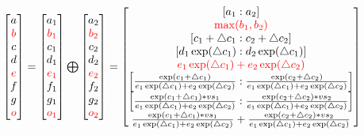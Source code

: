 $
\begin{bmatrix}
  a \\
  \textcolor{red}{b} \\
  c \\
  d \\
  \textcolor{red}{e} \\
  f \\
  g \\
  \textcolor{red}{o}
\end{bmatrix} = 
\begin{bmatrix}
  a_1 \\
  \textcolor{red}{b_1} \\
  c_1 \\
  d_1 \\
  \textcolor{red}{e_1} \\
  f_1 \\
  g_1 \\
  \textcolor{red}{o_1}
\end{bmatrix} \bigoplus
\begin{bmatrix}
a_2 \\
\textcolor{red}{b_2} \\
c_2 \\
d_2 \\
\textcolor{red}{e_2} \\
f_2 \\
g_2 \\
\textcolor{red}{o_2}
\end{bmatrix} = 
\begin{bmatrix}
[a_1:a_2] \\
\textcolor{red}{\max(b_1, b_2)} \\
\left[c_1 + \triangle c_1 : c_2 +\triangle c_2\right] \\
\left[d_1 \exp(\triangle c_1):d_2 \exp (\triangle c_1)\right] \\
\textcolor{red}{e_1 \exp(\triangle c_1)+ e_2 \exp(\triangle c_2)} \\
\left[\frac{\exp (c_1 + \triangle c_1)}{e_1 \exp(\triangle c_1)+ e_2 \exp(\triangle c_2)}: \frac{\exp (c_2 + \triangle c_2)}{e_1 \exp(\triangle c_1)+ e_2 \exp(\triangle c_2)} \right]\\
\left[\frac{\exp (c_1 + \triangle c_1)*vs_1}{e_1 \exp(\triangle c_1)+ e_2 \exp(\triangle c_2)}: \frac{\exp (c_2 + \triangle c_2)*vs_2}{e_1 \exp(\triangle c_1)+ e_2 \exp(\triangle c_2)} \right] \\
\frac{\exp (c_1 + \triangle c_1)*vs_1}{e_1 \exp(\triangle c_1)+ e_2 \exp(\triangle c_2)}+\frac{\exp (c_2 + \triangle c_2)*vs_2}{e_1 \exp(\triangle c_1)+ e_2 \exp(\triangle c_2)} 
\end{bmatrix}
$

